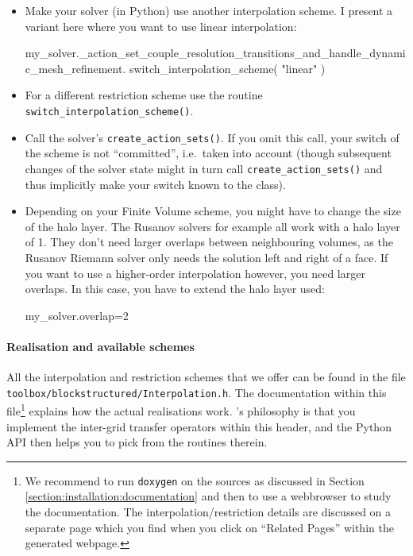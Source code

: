 \begin{itemize}
  \item Make your solver (in Python) use another interpolation scheme. I present
  a variant here where you want to use linear interpolation:
  \begin{code}
my_solver._action_set_couple_resolution_transitions_and_handle_dynamic_mesh_refinement.
  switch_interpolation_scheme( "linear" )
  \end{code}
  \item For a different restriction scheme use the routine
  \texttt{switch\_interpolation\_scheme()}.
  \item Call the solver's \texttt{create\_action\_sets()}. If you omit this
  call, your switch of the scheme is not ``committed'', i.e.~taken into account
  (though subsequent changes of the solver state might in turn call
  \texttt{create\_action\_sets()} and thus implicitly make your switch known to
  the class).
  \item Depending on your Finite Volume scheme, you might have to change the
  size of the halo layer. The Rusanov solvers for example all work with a halo
  layer of 1. They don't need larger overlaps between neighbouring volumes, as
  the Rusanov Riemann solver only needs the solution left and right of a face.
  If you want to use a higher-order interpolation however, you need larger
  overlaps. In this case, you have to extend the halo layer used:
  \begin{code}
my_solver.overlap=2
  \end{code}
\end{itemize}


\paragraph{Realisation and available schemes}
%
%
All the interpolation and restriction schemes that we offer can be found in the
file \texttt{toolbox/blockstructured/Interpolation.h}.
The documentation within this file\footnote{We recommend to run
\texttt{doxygen} on the sources as discussed in Section
\ref{section:installation:documentation} and then to use a webbrowser to study
the documentation. The interpolation/restriction details are discussed on a 
separate page which you find when you click on ``Related Pages'' within the
generated webpage.} explains how the actual realisations work.
\ExaHyPE's philosophy is that you implement the inter-grid transfer operators
within this header, and the Python API then helps you to pick from the routines
therein.

